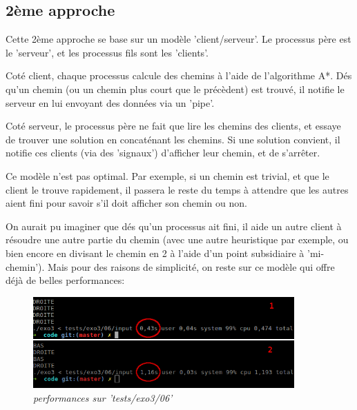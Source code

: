 \documentclass[10pt]{article}
\begin{document}
			
		\subsection{2ème approche}
		
			Cette 2ème approche se base sur un modèle 'client/serveur'.
			Le processus père est le 'serveur', et les processus fils sont les 'clients'.\newline

			Coté client, chaque processus calcule des chemins à l'aide de l'algorithme A*. Dés qu'un chemin
			(ou un chemin plus court que le précèdent) est trouvé, il notifie le serveur en lui envoyant
			des données via un 'pipe'.\newline
			
			Coté serveur, le processus père ne fait que lire les chemins des clients, et essaye de trouver une
			solution en concaténant les chemins. Si une solution convient, il notifie ces clients (via des 'signaux')
			d'afficher leur chemin, et de s'arrêter.\newline
			
			Ce modèle n'est pas optimal. Par exemple, si un chemin est trivial, et que le client
			le trouve rapidement, il passera le reste du temps à attendre que les autres aient fini
			pour savoir s'il doit afficher son chemin ou non.\newline
			
			On aurait pu imaginer que dés qu'un processus ait fini, il aide un autre client à résoudre une autre partie du chemin
			(avec une autre heuristique par exemple, ou bien encore en divisant le chemin en 2 à l'aide d'un point subsidiaire à 'mi-chemin').
			Mais pour des raisons de simplicité, on reste sur ce modèle qui offre déjà de belles performances:

			\begin{figure}[H]
				\begin{center}
					\includegraphics[width=10cm,height=\textheight,keepaspectratio]{./images/manhattan_performances.png}
				\end{center}
				\caption{\textit{performances sur 'tests/exo3/06'}}
			\end{figure}
\end{document}
